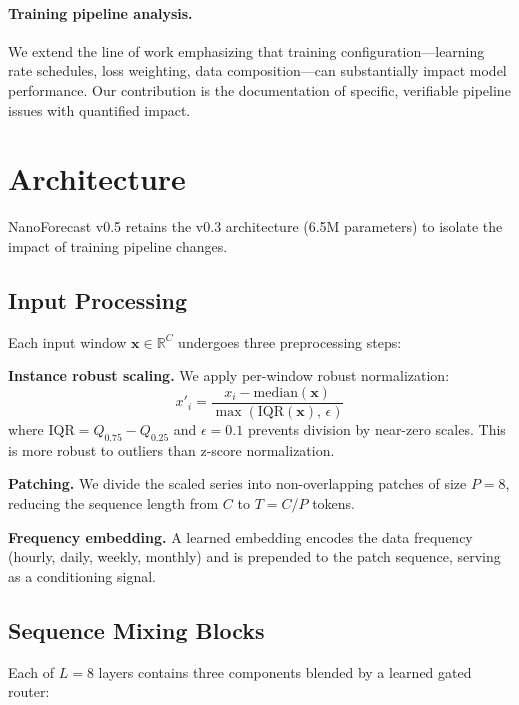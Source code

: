 \documentclass[11pt]{article}
\begin{document}
\paragraph{Training pipeline analysis.}
We extend the line of work emphasizing that training configuration---learning rate schedules, loss weighting, data composition---can substantially impact model performance. Our contribution is the documentation of specific, verifiable pipeline issues with quantified impact.

\section{Architecture}
\label{sec:architecture}

NanoForecast v0.5 retains the v0.3 architecture (6.5M parameters) to isolate the impact of training pipeline changes.

\subsection{Input Processing}
\label{sec:input}

Each input window $\mathbf{x} \in \mathbb{R}^C$ undergoes three preprocessing steps:

\textbf{Instance robust scaling.} We apply per-window robust normalization:
\begin{equation}
x'_i = \frac{x_i - \text{median}(\mathbf{x})}{\max(\text{IQR}(\mathbf{x}),\, \epsilon)}
\label{eq:scaling}
\end{equation}
where $\text{IQR} = Q_{0.75} - Q_{0.25}$ and $\epsilon = 0.1$ prevents division by near-zero scales. This is more robust to outliers than z-score normalization.

\textbf{Patching.} We divide the scaled series into non-overlapping patches of size $P=8$, reducing the sequence length from $C$ to $T = C / P$ tokens.

\textbf{Frequency embedding.} A learned embedding encodes the data frequency (hourly, daily, weekly, monthly) and is prepended to the patch sequence, serving as a conditioning signal.

\subsection{Sequence Mixing Blocks}
\label{sec:mixing}

Each of $L=8$ layers contains three components blended by a learned gated router:
\end{document}
